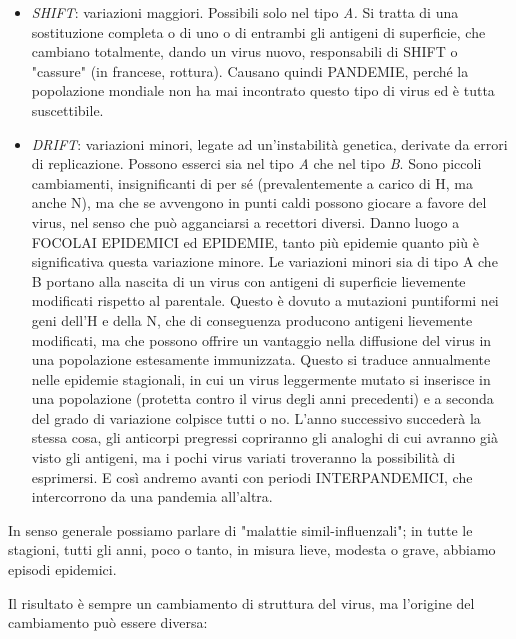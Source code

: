 \begin{itemize}
\item
  \emph{SHIFT}: variazioni maggiori. Possibili solo nel tipo \emph{A.}
  Si tratta di una sostituzione completa o di uno o di entrambi gli
  antigeni di superficie, che cambiano totalmente, dando un virus nuovo,
  responsabili di SHIFT o "cassure" (in francese, rottura). Causano
  quindi PANDEMIE, perché la popolazione mondiale non ha mai incontrato
  questo tipo di virus ed è tutta suscettibile.
\item
  \emph{DRIFT}: variazioni minori, legate ad un'instabilità genetica,
  derivate da errori di replicazione. Possono esserci sia nel tipo
  \emph{A} che nel tipo \emph{B}. Sono piccoli cambiamenti,
  insignificanti di per sé (prevalentemente a carico di H, ma anche N),
  ma che se avvengono in punti caldi possono giocare a favore del virus,
  nel senso che può agganciarsi a recettori diversi. Danno luogo a
  FOCOLAI EPIDEMICI ed EPIDEMIE, tanto più epidemie quanto più è
  significativa questa variazione minore. Le variazioni minori sia di
  tipo A che B portano alla nascita di un virus con antigeni di
  superficie lievemente modificati rispetto al parentale. Questo è
  dovuto a mutazioni puntiformi nei geni dell'H e della N, che di
  conseguenza producono antigeni lievemente modificati, ma che possono
  offrire un vantaggio nella diffusione del virus in una popolazione
  estesamente immunizzata. Questo si traduce annualmente nelle epidemie
  stagionali, in cui un virus leggermente mutato si inserisce in una
  popolazione (protetta contro il virus degli anni precedenti) e a
  seconda del grado di variazione colpisce tutti o no. L'anno successivo
  succederà la stessa cosa, gli anticorpi pregressi copriranno gli
  analoghi di cui avranno già visto gli antigeni, ma i pochi virus
  variati troveranno la possibilità di esprimersi. E così andremo avanti
  con periodi INTERPANDEMICI, che intercorrono da una pandemia
  all'altra.
\end{itemize}
  In senso generale possiamo parlare di "malattie simil-influenzali"; in
  tutte le stagioni, tutti gli anni, poco o tanto, in misura lieve,
  modesta o grave, abbiamo episodi epidemici.

  Il risultato è sempre un cambiamento di struttura del virus, ma
  l'origine del cambiamento può essere diversa:


